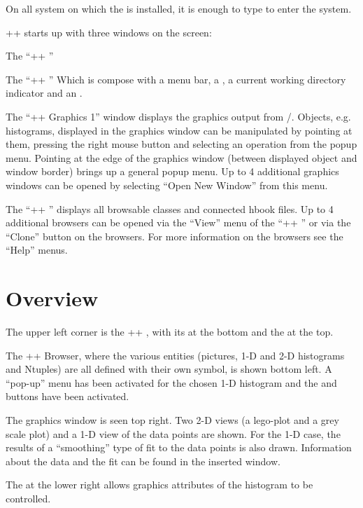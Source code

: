 On all system on which the \CERNLIB{} is installed, it is enough to
type  to enter the system.

\PAW++{} starts up with three windows on the screen:

\begin{DL}{The ``\PAW++{} \EW''}
\item[The ``\PAW++{} \EW'']
   Which is compose with a menu bar, a \TP, a current working
   directory indicator and an \IP.

\item[The ``\PAW++{} Graphics 1'']
   window displays the graphics output from \HIGZ/.
   Objects, e.g. histograms, displayed in the graphics window can be
   manipulated by pointing at them, pressing the right mouse button and
   selecting an operation from the popup menu. Pointing at the edge of the
   graphics window (between displayed object and window border) brings up a
   general popup menu. Up to 4 additional graphics windows can be opened by
   selecting ``Open New Window'' from this menu.

\item[The ``\PAW++{} \MB'']
   displays all browsable classes and connected
   hbook files. Up to 4 additional browsers can be opened via the ``View'' menu
   of the ``\PAW++{} \EW'' or via the ``Clone'' button on the
   browsers. For more information on the browsers see the ``Help'' menus.
\end{DL}

\section{Overview}


\begin{UL}
\item The upper left corner is the \PAW++{} \EW, with its \IP{}
      at the bottom and the \TP{} at the top.
\item The \PAW++{} Browser, where the various entities (pictures, 1-D and
      2-D histograms and Ntuples) are all defined with their own symbol,
      is shown bottom left.
      A ``pop-up'' menu has been activated for the chosen 1-D
      histogram and the  and  buttons have been activated.
\item The graphics window is seen top right.
      Two 2-D views (a lego-plot and a grey scale plot) and a 1-D
      view of the data points are shown.
      For the 1-D case, the results of
      a ``smoothing'' type of fit to the data points is also drawn.
      Information about the data and the fit can be found
      in the inserted window.
\item The \HSP{} at the lower right allows graphics
      attributes of the histogram to be controlled.
\end{UL}

